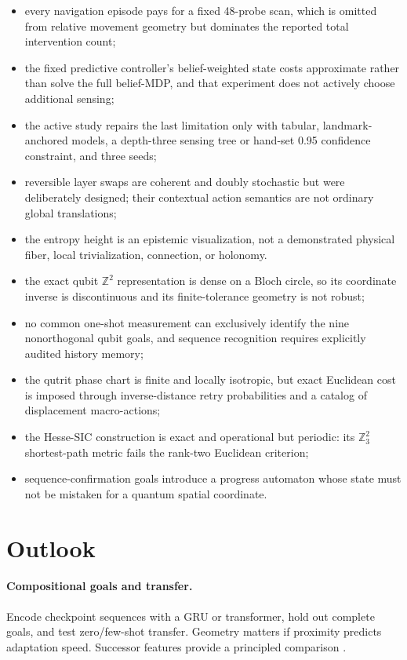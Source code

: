 \documentclass[11pt]{article}
\begin{document}
\begin{itemize}
 quantum resource is responsible for localization;
 \item every navigation episode pays for a fixed 48-probe scan, which is
 omitted from relative movement geometry but dominates the reported total
 intervention count;
 \item the fixed predictive controller's belief-weighted state costs
 approximate rather than solve the full belief-MDP, and that experiment does
 not actively choose additional sensing;
 \item the active study repairs the last limitation only with tabular,
 landmark-anchored models, a depth-three sensing tree or hand-set 0.95
 confidence constraint, and three seeds;
 \item reversible layer swaps are coherent and doubly stochastic but were
 deliberately designed; their contextual action semantics are not ordinary
 global translations;
 \item the entropy height is an epistemic visualization, not a demonstrated
 physical fiber, local trivialization, connection, or holonomy.
 \item the exact qubit $\mathbb Z^2$ representation is dense on a Bloch circle,
 so its coordinate inverse is discontinuous and its finite-tolerance geometry
 is not robust;
 \item no common one-shot measurement can exclusively identify the nine
 nonorthogonal qubit goals, and sequence recognition requires explicitly
 audited history memory;
 \item the qutrit phase chart is finite and locally isotropic, but exact
 Euclidean cost is imposed through inverse-distance retry probabilities and a
 catalog of displacement macro-actions;
 \item the Hesse-SIC construction is exact and operational but periodic: its
 $\mathbb Z_3^2$ shortest-path metric fails the rank-two Euclidean criterion;
 \item sequence-confirmation goals introduce a progress automaton whose state
 must not be mistaken for a quantum spatial coordinate.
\end{itemize}

\section{Outlook}
\label{sec:outlook}

\paragraph{Compositional goals and transfer.}
Encode checkpoint sequences with a GRU or transformer, hold out complete goals,
and test zero/few-shot transfer. Geometry matters if proximity predicts
adaptation speed. Successor features provide a principled comparison
\cite{barreto2017}.
\end{document}
